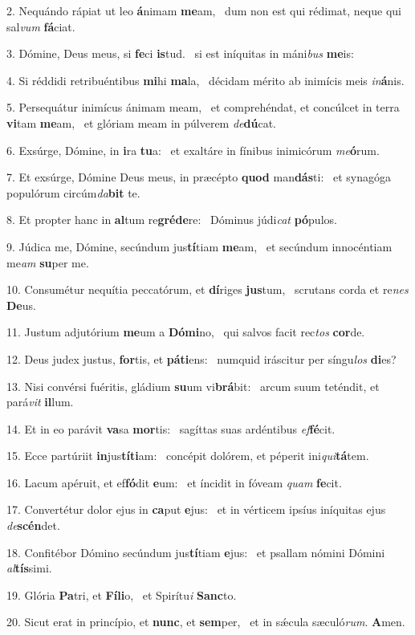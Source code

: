 2. Nequándo rápiat ut leo \textbf{á}nimam \textbf{me}am, \ast\  dum non est qui rédimat, neque qui sal\textit{vum} \textbf{fá}ciat.\

3. Dómine, Deus meus, si \textbf{fe}ci \textbf{is}tud. \ast\  si est iníquitas in máni\textit{bus} \textbf{me}is:\

4. Si réddidi retribuéntibus \textbf{mi}hi \textbf{ma}la, \ast\  décidam mérito ab inimícis meis \textit{in}\textbf{á}nis.\

5. Persequátur inimícus ánimam meam, \dag\  et comprehéndat, et concúlcet in terra \textbf{vi}tam \textbf{me}am, \ast\  et glóriam meam in púlverem \textit{de}\textbf{dú}cat.\

6. Exsúrge, Dómine, in \textbf{i}ra \textbf{tu}a: \ast\  et exaltáre in fínibus inimicórum \textit{me}\textbf{ó}rum.\

7. Et exsúrge, Dómine Deus meus, in præcépto \textbf{quod} man\textbf{dás}ti: \ast\  et synagóga populórum circúm\textit{da}\textbf{bit} te.\

8. Et propter hanc in \textbf{al}tum re\textbf{gré}\textbf{de}re: \ast\  Dóminus júdi\textit{cat} \textbf{pó}pulos.\

9. Júdica me, Dómine, secúndum jus\textbf{tí}tiam \textbf{me}am, \ast\  et secúndum innocéntiam me\textit{am} \textbf{su}per me.\

10. Consumétur nequítia peccatórum, et \textbf{dí}riges \textbf{jus}tum, \ast\  scrutans corda et re\textit{nes} \textbf{De}us.\

11. Justum adjutórium \textbf{me}um a \textbf{Dó}\textbf{mi}no, \ast\  qui salvos facit rec\textit{tos} \textbf{cor}de.\

12. Deus judex justus, \textbf{for}tis, et \textbf{pá}\textbf{ti}ens: \ast\  numquid iráscitur per síngu\textit{los} \textbf{di}es?\

13. Nisi convérsi fuéritis, gládium \textbf{su}um vi\textbf{brá}bit: \ast\  arcum suum teténdit, et pará\textit{vit} \textbf{il}lum.\

14. Et in eo parávit \textbf{va}sa \textbf{mor}tis: \ast\  sagíttas suas ardéntibus \textit{ef}\textbf{fé}cit.\

15. Ecce partúriit \textbf{in}jus\textbf{tí}\textbf{ti}am: \ast\  concépit dolórem, et péperit ini\textit{qui}\textbf{tá}tem.\

16. Lacum apéruit, et ef\textbf{fó}dit \textbf{e}um: \ast\  et íncidit in fóveam \textit{quam} \textbf{fe}cit.\

17. Convertétur dolor ejus in \textbf{ca}put \textbf{e}jus: \ast\  et in vérticem ipsíus iníquitas ejus \textit{de}\textbf{scén}det.\

18. Confitébor Dómino secúndum jus\textbf{tí}tiam \textbf{e}jus: \ast\  et psallam nómini Dómini \textit{al}\textbf{tís}simi.\

19. Glória \textbf{Pa}tri, et \textbf{Fí}\textbf{li}o, \ast\  et Spirítu\textit{i} \textbf{Sanc}to.\

20. Sicut erat in princípio, et \textbf{nunc}, et \textbf{sem}per, \ast\  et in sǽcula sæculó\textit{rum}. \textbf{A}men.\

